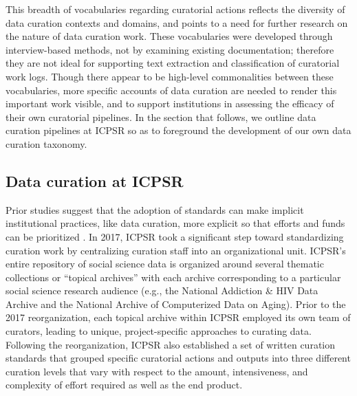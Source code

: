 \documentclass[conference]{IEEEtran}
\begin{document}
This breadth of vocabularies regarding curatorial actions reflects the diversity of data curation contexts and domains, and points to a need for further research on the nature of data curation work. These vocabularies were developed through interview-based methods, not by examining existing documentation; therefore they are not ideal for supporting text extraction and classification of curatorial work logs. Though there appear to be high-level commonalities between these vocabularies, more specific accounts of data curation are needed to render this important work visible, and to support institutions in assessing the efficacy of their own curatorial pipelines. In the section that follows, we outline data curation pipelines at ICPSR so as to foreground the development of our own data curation taxonomy.

\subsection{Data curation at ICPSR}
\label{data-curation-at-ICPSR}
Prior studies suggest that the adoption of standards can make implicit institutional practices, like data curation, more explicit so that efforts and funds can be prioritized \cite{Mayernik2016-pa}. In 2017, ICPSR took a significant step toward standardizing curation work by centralizing curation staff into an organizational unit. ICPSR’s entire repository of social science data is organized around several thematic collections or “topical archives” with each archive corresponding to a particular social science research audience (e.g., the National Addiction \& HIV Data Archive and the National Archive of Computerized Data on Aging). Prior to the 2017 reorganization, each topical archive within ICPSR employed its own team of curators, leading to unique, project-specific approaches to curating data. Following the reorganization, ICPSR also established a set of written curation standards that grouped specific curatorial actions and outputs into three different curation levels that vary with respect to the amount, intensiveness, and complexity of effort required as well as the end product. 
\end{document}
